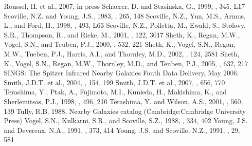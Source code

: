 \documentclass[manuscript]{aastex}
\begin{document}
\begin{thebibliography}{}
 Roussel, H. et al., 2007, in press
 Schaerer, D. and Stasinska, G., 1999, \aap, 345, L17
 Scoville, N.Z. and Young, J.S., 1983, \aj, 265, 148
 Scoville, N.Z., Yun, M.S., Armus, L., and Ford, H., 1998, \apj, 493, L63 
 Scoville, N.Z., Polletta, M., Ewald, S., Stolovy, S.R., Thompson, R., and Rieke, M., 2001, \aj, 122, 3017
 Sheth, K., Regan, M.W., Vogel, S.N., and Teuben, P.J., 2000, \apj, 532, 221 
 Sheth, K., Vogel, S.N., Regan, M.W., Tueben, P.J., Harris, A.I., and Thornley, M.D., 2002, \aj, 124, 2581
 Sheth, K., Vogel, S.N., Regan, M.W., Thornley, M.D., and Teuben, P.J., 2005, \apj, 632, 217
 SINGS: The Spitzer Infrared Nearby Galaxies Fouth Data Delivery, May 2006.
 Smith, J.D.T. et al., 2004, \apjs, 154, 199
 Smith, J.D.T. et al., 2007, \apj, 656, 770
 Terashima, Y., Ptak, A., Fujimoto, M.I., Kunieda, H., Makishima, K., and Sherlemitsos, P.J., 1998, \apj, 496, 210
 Terashima, Y. and Wilson, A.S., 2001, \apj, 560, 139
 Tully, R.B. 1988, Nearby Galaxies catalog (Cambridge:Cambridge University Press)
 Vogel, S.N., Kulkarni, S.R., and Scoville, S.Z., 1988, \nat, 334, 402
 Young, J.S. and Devereux, N.A., 1991, \apj, 373, 414
 Young, J.S. and Scoville, N.Z., 1991, \araa, 29, 581
\end{thebibliography}

\clearpage

\begin{figure}
 \end{figure}
 \clearpage
 
\end{document}
